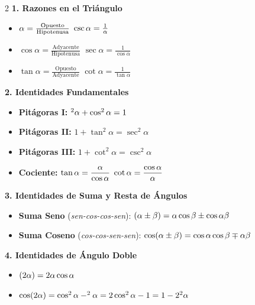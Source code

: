 \documentclass[letterpaper, 12pt]{article}
\let\sin\relax
\DeclareMathOperator{\sin}{sen}
\begin{document}
\begin{tcolorbox}[colback=celesteSuave, colframe=azulFuerte, title=\textbf{RESUMEN DE CLASES: LO QUE DEBES SABER}, fonttitle=\bfseries]
\begin{multicols}{2}
    \textbf{1. Razones en el Triángulo}
    \begin{itemize}[leftmargin=10pt]
        \item $\sin \alpha = \frac{\text{Opuesto}}{\text{Hipotenusa}}$ \quad $\csc \alpha = \frac{1}{\sin \alpha}$
        \item $\cos \alpha = \frac{\text{Adyacente}}{\text{Hipotenusa}}$ \quad $\sec \alpha = \frac{1}{\cos \alpha}$
        \item $\tan \alpha = \frac{\text{Opuesto}}{\text{Adyacente}}$ \quad $\cot \alpha = \frac{1}{\tan \alpha}$
    \end{itemize}

    \columnbreak

    \textbf{2. Identidades Fundamentales}
    \begin{itemize}[leftmargin=10pt]
        \item \textbf{Pitágoras I:} $\sin^2 \alpha + \cos^2 \alpha = 1$
        \item \textbf{Pitágoras II:} $1 + \tan^2 \alpha = \sec^2 \alpha$
        \item \textbf{Pitágoras III:} $1 + \cot^2 \alpha = \csc^2 \alpha$
        \item \textbf{Cociente:} $\tan \alpha = \dfrac{\sin \alpha}{\cos \alpha}$ \quad $\cot \alpha = \dfrac{\cos \alpha}{\sin \alpha}$
    \end{itemize}
\end{multicols}

\vspace{0.1cm}
\textbf{3. Identidades de Suma y Resta de Ángulos}
\begin{itemize}[leftmargin=10pt, itemsep=0.15cm]
    \item \textbf{Suma Seno} (\textit{sen-cos-cos-sen}): $\sin(\alpha \pm \beta) = \sin \alpha \cos \beta \pm \cos \alpha \sin \beta$
    \item \textbf{Suma Coseno} (\textit{cos-cos-sen-sen}): $\cos(\alpha \pm \beta) = \cos \alpha \cos \beta \mp \sin \alpha \sin \beta$
\end{itemize}

\vspace{0.1cm}
\textbf{4. Identidades de Ángulo Doble}
\begin{itemize}[leftmargin=10pt, itemsep=0.15cm]
    \item $\sin(2\alpha) = 2\sin\alpha\cos\alpha$
    \item $\cos(2\alpha) = \cos^2\alpha - \sin^2\alpha = 2\cos^2\alpha - 1 = 1 - 2\sin^2\alpha$
\end{itemize}


\end{tcolorbox}
\end{document}
